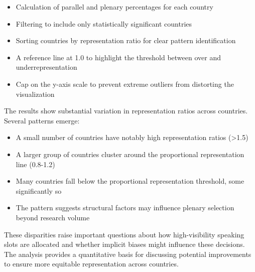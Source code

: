 \documentclass[a4paper,11pt]{article}
\begin{document}
\begin{itemize}
    \item Calculation of parallel and plenary percentages for each country
    \item Filtering to include only statistically significant countries
    \item Sorting countries by representation ratio for clear pattern identification
    \item A reference line at 1.0 to highlight the threshold between over and underrepresentation
    \item Cap on the y-axis scale to prevent extreme outliers from distorting the visualization
\end{itemize}

The results show substantial variation in representation ratios across countries. Several patterns emerge:

\begin{itemize}
    \item A small number of countries have notably high representation ratios (>1.5)
    \item A larger group of countries cluster around the proportional representation line (0.8-1.2)
    \item Many countries fall below the proportional representation threshold, some significantly so
    \item The pattern suggests structural factors may influence plenary selection beyond research volume
\end{itemize}

These disparities raise important questions about how high-visibility speaking slots are allocated and whether implicit biases might influence these decisions. The analysis provides a quantitative basis for discussing potential improvements to ensure more equitable representation across countries.
\end{document}
